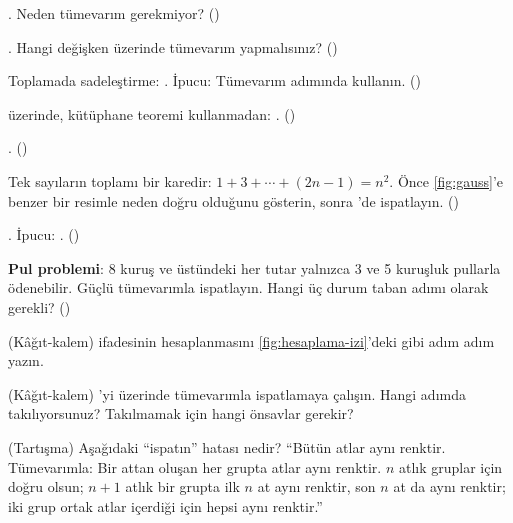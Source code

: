 \begin{alistirmalar}
 . Neden tümevarım
gerekmiyor? ()

 . Hangi değişken üzerinde
tümevarım yapmalısınız? ()

 Toplamada sadeleştirme: .
İpucu: Tümevarım adımında  kullanın. ()

  üzerinde, kütüphane teoremi kullanmadan:
. ()

 . ()

 Tek sayıların toplamı bir karedir:
$1 + 3 + \cdots + (2n-1) = n^2$. Önce \cref{fig:gauss}'e benzer bir
resimle neden doğru olduğunu gösterin, sonra \Lean{}'de ispatlayın.
()

 . İpucu: . ()

 \textbf{Pul problemi}: 8 kuruş ve üstündeki her tutar
yalnızca 3 ve 5 kuruşluk pullarla ödenebilir. Güçlü tümevarımla
ispatlayın. Hangi üç durum taban adımı olarak gerekli? ()

 (Kâğıt-kalem)  ifadesinin hesaplanmasını
\cref{fig:hesaplama-izi}'deki gibi adım adım yazın.

 (Kâğıt-kalem) 'yi  üzerinde
tümevarımla ispatlamaya çalışın. Hangi adımda takılıyorsunuz?
Takılmamak için hangi önsavlar gerekir?

 (Tartışma) Aşağıdaki ``ispatın'' hatası nedir?
``Bütün atlar aynı renktir. Tümevarımla: Bir attan oluşan her grupta
atlar aynı renktir. $n$ atlık gruplar için doğru olsun; $n+1$ atlık bir
grupta ilk $n$ at aynı renktir, son $n$ at da aynı renktir; iki grup
ortak atlar içerdiği için hepsi aynı renktir.''
\end{alistirmalar}

